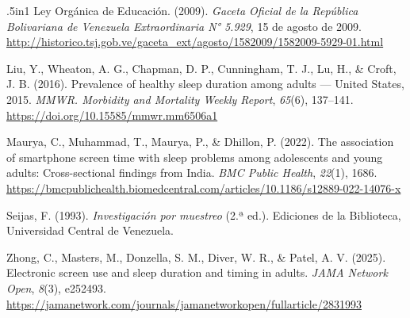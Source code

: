 \documentclass[12pt, letterpaper]{article}
\begin{document}
\begin{hangparas}{.5in}{1}
Ley Orgánica de Educación. (2009). \textit{Gaceta Oficial de la República Bolivariana de Venezuela Extraordinaria N° 5.929}, 15 de agosto de 2009. \url{http://historico.tsj.gob.ve/gaceta_ext/agosto/1582009/1582009-5929-01.html}

Liu, Y., Wheaton, A. G., Chapman, D. P., Cunningham, T. J., Lu, H., \& Croft, J. B. (2016). Prevalence of healthy sleep duration among adults --- United States, 2015. \textit{MMWR. Morbidity and Mortality Weekly Report}, \textit{65}(6), 137--141. \url{https://doi.org/10.15585/mmwr.mm6506a1}

Maurya, C., Muhammad, T., Maurya, P., \& Dhillon, P. (2022). The association of smartphone screen time with sleep problems among adolescents and young adults: Cross-sectional findings from India. \textit{BMC Public Health}, \textit{22}(1), 1686. \url{https://bmcpublichealth.biomedcentral.com/articles/10.1186/s12889-022-14076-x}

Seijas, F. (1993). \textit{Investigación por muestreo} (2.ª ed.). Ediciones de la Biblioteca, Universidad Central de Venezuela.

Zhong, C., Masters, M., Donzella, S. M., Diver, W. R., \& Patel, A. V. (2025). Electronic screen use and sleep duration and timing in adults. \textit{JAMA Network Open}, \textit{8}(3), e252493. \url{https://jamanetwork.com/journals/jamanetworkopen/fullarticle/2831993}
\end{hangparas}
\end{document}
